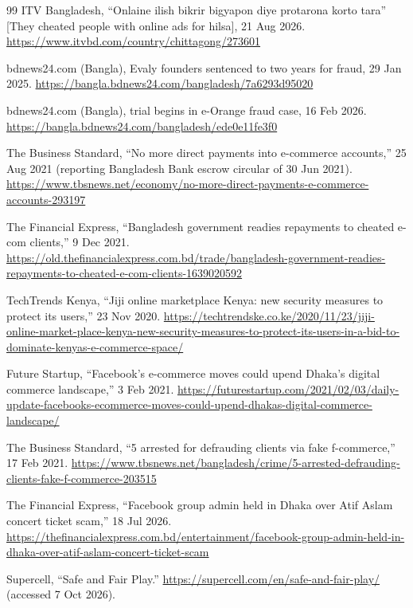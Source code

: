 \documentclass[11pt,a4paper]{article}
\begin{document}
\begin{thebibliography}{99}
 ITV Bangladesh, ``Onlaine ilish bikrir bigyapon diye protarona korto
tara'' [They cheated people with online ads for hilsa], 21 Aug 2026.
\url{https://www.itvbd.com/country/chittagong/273601}

 bdnews24.com (Bangla), Evaly founders sentenced to two years for
fraud, 29 Jan 2025. \url{https://bangla.bdnews24.com/bangladesh/7a6293d95020}

 bdnews24.com (Bangla), trial begins in e-Orange fraud case,
16 Feb 2026. \url{https://bangla.bdnews24.com/bangladesh/ede0e11fe3f0}

 The Business Standard, ``No more direct payments into e-commerce
accounts,'' 25 Aug 2021 (reporting Bangladesh Bank escrow circular of 30 Jun 2021).
\url{https://www.tbsnews.net/economy/no-more-direct-payments-e-commerce-accounts-293197}

 The Financial Express, ``Bangladesh government readies repayments to
cheated e-com clients,'' 9 Dec 2021.
\url{https://old.thefinancialexpress.com.bd/trade/bangladesh-government-readies-repayments-to-cheated-e-com-clients-1639020592}

 TechTrends Kenya, ``Jiji online marketplace Kenya: new security measures
to protect its users,'' 23 Nov 2020.
\url{https://techtrendske.co.ke/2020/11/23/jiji-online-market-place-kenya-new-security-measures-to-protect-its-users-in-a-bid-to-dominate-kenyas-e-commerce-space/}

 Future Startup, ``Facebook's e-commerce moves could upend Dhaka's digital
commerce landscape,'' 3 Feb 2021.
\url{https://futurestartup.com/2021/02/03/daily-update-facebooks-ecommerce-moves-could-upend-dhakas-digital-commerce-landscape/}

 The Business Standard, ``5 arrested for defrauding clients via fake
f-commerce,'' 17 Feb 2021.
\url{https://www.tbsnews.net/bangladesh/crime/5-arrested-defrauding-clients-fake-f-commerce-203515}

 The Financial Express, ``Facebook group admin held in Dhaka over Atif Aslam
concert ticket scam,'' 18 Jul 2026.
\url{https://thefinancialexpress.com.bd/entertainment/facebook-group-admin-held-in-dhaka-over-atif-aslam-concert-ticket-scam}

 Supercell, ``Safe and Fair Play.''
\url{https://supercell.com/en/safe-and-fair-play/} (accessed 7 Oct 2026).


\end{thebibliography}
\end{document}
